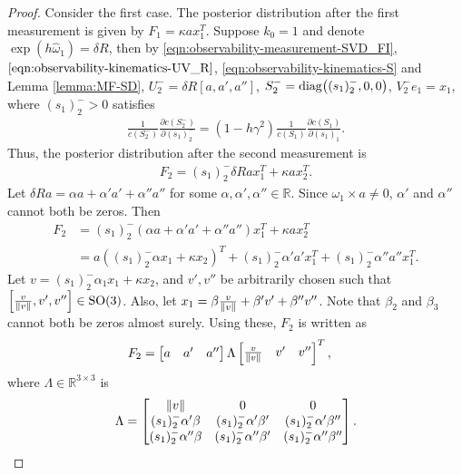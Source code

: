 \begin{proof}
	Consider the first case.
	The posterior distribution after the first measurement is given by $F_1 = \kappa ax_1^T$.
	Suppose $k_0=1$ and denote $\exp(h\hat{\omega}_1) = \delta R$, then by \eqref{eqn:observability-measurement-SVD_FI}, $\eqref{eqn:observability-kinematics-UV_R}$, \eqref{eqn:observability-kinematics-S} and Lemma \ref{lemma:MF-SD}, $U_2^- = \delta R[ a, a', a'' ]$, $S_2^- = \mathrm{diag}\big((s_1)_2^-,0,0\big)$, $V_2^-e_1 = x_1$, where $(s_1)_2^->0$ satisfies
	\begin{align*}
		\frac{1}{c(S_{2}^-)}\frac{\partial c(S_2^-)}{\partial (s_1)_2^-} = (1-h\gamma^2) \frac{1}{c(S_1)}\frac{\partial c(S_1)}{\partial(s_1)_1}.
	\end{align*}
	Thus, the posterior distribution after the second measurement is
	\begin{align} \label{eqn:observability-F2}
		F_2 = (s_1)_2^-\delta Rax_1^T + \kappa ax_2^T.
	\end{align}
	Let $\delta Ra = \alpha a + \alpha'a' + \alpha''a''$ for some $\alpha,\alpha',\alpha''\in\mathbb{R}$. 
	Since $\omega_1\times a\neq 0$, $\alpha'$ and $\alpha''$ cannot both be zeros.
	Then
	\begin{align*}
		F_2 &= (s_1)_2^-(\alpha a + \alpha'a' + \alpha''a'')x_1^T + \kappa ax_2^T \\
		&= a((s_1)_2^-\alpha x_1 + \kappa x_2)^T + (s_1)_2^-\alpha'a'x_1^T + (s_1)_2^-\alpha''a''x_1^T.
	\end{align*}
	Let $v = (s_1)_2^-\alpha_1x_1 + \kappa x_2$, and $v',v''$ be arbitrarily chosen such that $\Big[ \frac{v}{\left\| v \right\|}, v', v'' \Big] \in \mathrm{SO}(3)$.
	Also, let $x_1 = \beta\frac{v}{\left\| v \right\|} + \beta'v' + \beta''v''$. 
	Note that $\beta_2$ and $\beta_3$ cannot both be zeros almost surely.
	Using these, $F_2$ is written as
	\begin{align*}
		F_2 &= \begin{bmatrix}a&a'&a''\end{bmatrix}  \Lambda \begin{bmatrix} \frac{v}{\left\| v \right\|} & v' & v'' \end{bmatrix}^T,
	\end{align*}
	where $\Lambda\in\mathbb{R}^{3\times 3}$ is
	\begin{align*}
		\Lambda = \begin{bmatrix} \norm{v} & 0 & 0 \\ (s_1)_2^-\alpha'\beta & (s_1)_2^-\alpha'\beta' & (s_1)_2^-\alpha'\beta'' \\ (s_1)_2^-\alpha''\beta & (s_1)_2^-\alpha''\beta' & (s_1)_2^-\alpha''\beta'' \end{bmatrix}.

\end{align*}
\end{proof}
